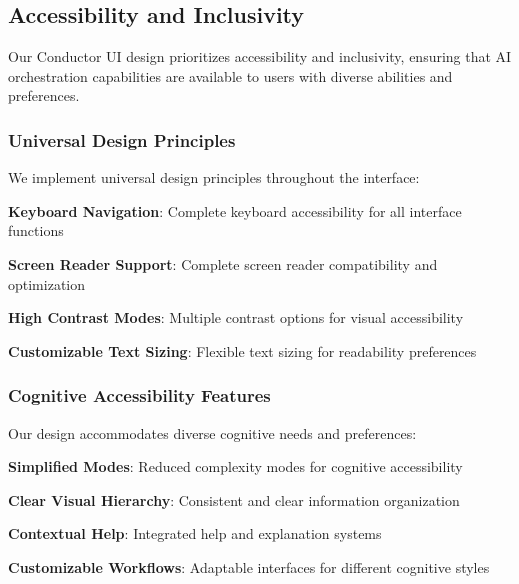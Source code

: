 \subsection*{Accessibility and Inclusivity}

Our Conductor UI design prioritizes accessibility and inclusivity, ensuring that AI orchestration capabilities are available to users with diverse abilities and preferences.

\subsubsection*{Universal Design Principles}

We implement universal design principles throughout the interface:

\begin{compactlist}
    \item \textbf{Keyboard Navigation}: Complete keyboard accessibility for all interface functions
    \item \textbf{Screen Reader Support}: Complete screen reader compatibility and optimization
    \item \textbf{High Contrast Modes}: Multiple contrast options for visual accessibility
    \item \textbf{Customizable Text Sizing}: Flexible text sizing for readability preferences
\end{compactlist}

\subsubsection*{Cognitive Accessibility Features}

Our design accommodates diverse cognitive needs and preferences:

\begin{compactlist}
    \item \textbf{Simplified Modes}: Reduced complexity modes for cognitive accessibility
    \item \textbf{Clear Visual Hierarchy}: Consistent and clear information organization
    \item \textbf{Contextual Help}: Integrated help and explanation systems
    \item \textbf{Customizable Workflows}: Adaptable interfaces for different cognitive styles
\end{compactlist}

